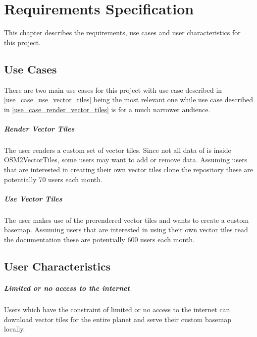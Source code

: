 \chapter{Requirements Specification}\label{requirements_specification}

This chapter describes the requirements, use cases and user characteristics for this project.

\section{Use Cases}\label{use_cases}

There are two main use cases for this project with use case described in \autoref{use_case_use_vector_tiles} being the most relevant one while use case described in \autoref{use_case_render_vector_tiles} is for a much narrower audience.

\paragraph{Render Vector Tiles}\label{use_case_render_vector_tiles}

The user renders a custom set of vector tiles. Since not all data of \osm{} is inside OSM2VectorTiles, some users may want to add or remove data. Assuming users that are interested in creating their own vector tiles clone the \osmvt{} repository these are potentially 70 users each month.

\paragraph{Use Vector Tiles}\label{use_case_use_vector_tiles}

The user makes use of the prerendered vector tiles and wants to create a custom basemap. Assuming users that are interested in using their own vector tiles read the documentation these are potentially 600 users each month.

\section{User Characteristics}\label{user_characteristics}

\paragraph{Limited or no access to the internet}

Users which have the constraint of limited or no access to the internet can download vector tiles for the entire planet and serve their custom basemap locally.

